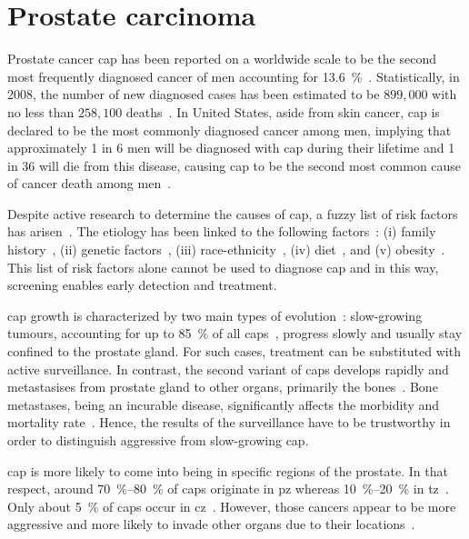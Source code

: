 \section{Prostate carcinoma}
Prostate cancer \ac{cap} has been reported on a worldwide scale to be the second most frequently diagnosed cancer of men accounting for \SI{13.6}{\percent}~\cite{Ferlay2010}.
Statistically, in 2008, the number of new diagnosed cases has been estimated to be $899,000$ with no less than $258,100$ deaths~\cite{Ferlay2010}.
In United States, aside from skin cancer, \ac{cap} is declared to be the most commonly diagnosed cancer among men, implying that approximately 1 in 6 men will be diagnosed with \ac{cap} during their lifetime and 1 in 36 will die from this disease, causing \ac{cap} to be the second most common cause of cancer death among men~\cite{Siegel2013,Society2013}.

Despite active research to determine the causes of \ac{cap}, a fuzzy list of risk factors has arisen~\cite{Society2010}.
The etiology has been linked to the following factors~\cite{Society2010}: (i) family history~\cite{Giovannucci2007,Steinberg1990}, (ii) genetic factors~\cite{Freedman2006,Amundadottir2006,Agalliu2009}, (iii) race-ethnicity~\cite{Giovannucci2007,Hoffman2001}, (iv) diet~\cite{Giovannucci2007,Ma2009,Alexander2010}, and (v) obesity~\cite{Giovannucci2007,Rodriguez2007}.
This list of risk factors alone cannot be used to diagnose \ac{cap} and in this way, screening enables early detection and treatment.

\ac{cap} growth is characterized by two main types of evolution~\cite{Strum2005}: slow-growing tumours, accounting for up to \SI{85}{\percent} of all \acp{cap}~\cite{Lu-Yao2009}, progress slowly and usually stay confined to the prostate gland.
For such cases, treatment can be substituted with active surveillance.
In contrast, the second variant of \acp{cap} develops rapidly and metastasises from prostate gland to other organs, primarily the bones~\cite{Oster2013}.
Bone metastases, being an incurable disease, significantly affects the morbidity and mortality rate~\cite{Ye2007}.
Hence, the results of the surveillance have to be trustworthy in order to distinguish aggressive from slow-growing \ac{cap}.

\ac{cap} is more likely to come into being in specific regions of the prostate.
In that respect, around \SIrange{70}{80}{\percent} of \acp{cap} originate in \ac{pz} whereas \SIrange{10}{20}{\percent} in \ac{tz}~\cite{Carrol1987,McNeal1988,Stamey1998}.
Only about \SI{5}{\percent} of \acp{cap} occur in \ac{cz}~\cite{McNeal1988,Cohen2008}.
However, those cancers appear to be more aggressive and more likely to invade other organs due to their locations~\cite{Cohen2008}.




